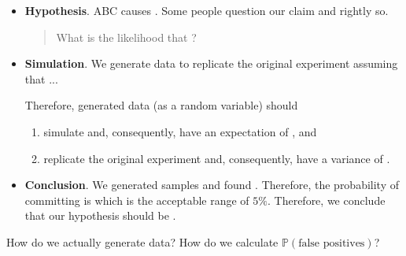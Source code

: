 \documentclass[../main.tex]{subfiles}
\begin{document}
\begin{example}
\begin{itemize}[wide]
    \item \textbf{Hypothesis}. ABC causes \underline{\hspace{2in}}.  Some people question our claim and rightly so.

      \begin{quote}
        \faQuestion{} What is the likelihood that \underline{\hspace{3in}}?
      \end{quote}

    \item \textbf{Simulation}.  We generate data to replicate the original experiment assuming that ...

      Therefore, generated data (as a random variable) should 
      \begin{enumerate}
        \item simulate \underline{\hspace{2in}} and, consequently, have an expectation of \underline{\hspace{1cm}}, and
        \item replicate the original experiment and, consequently, have a variance of \underline{\hspace{1cm}}.  
      \end{enumerate}



    \item \textbf{Conclusion}. We generated \underline{\hspace{1.5cm}} samples and found \underline{\hspace{2cm}} \underline{\hspace{2in}}. Therefore, the probability of committing \underline{\hspace{2in}} is \underline{\hspace{1cm}} which is \underline{\hspace{1in}} the acceptable range of \(5\%\). Therefore, we conclude that our hypothesis should be \underline{\hspace{1in}}.
  \end{itemize}
  \clearpage
  
  How do we actually generate data? How do we calculate \(\mathbb{P}(\text{false positives})\)?


\end{example}
\end{document}
